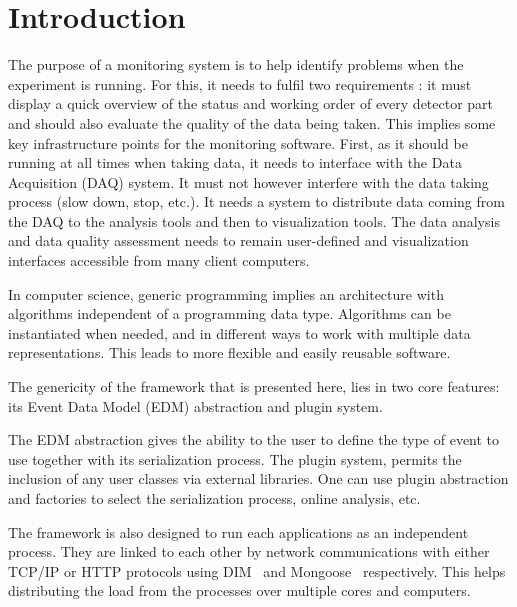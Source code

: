 \documentclass[conference]{IEEEtran}
\begin{document}
%
\IEEEpeerreviewmaketitle



\section{Introduction}
The purpose of a monitoring system is to help identify problems when the experiment is running. For this, it needs to fulfil two requirements : it must display a quick overview of the status and working order of every detector part and should also evaluate the quality of the data being taken. This implies some key infrastructure points for the monitoring software. First, as it should be running at all times when taking data, it needs to interface with the Data Acquisition (DAQ) system. It must not however interfere with the data taking process (slow down, stop, etc.). It needs a system to distribute data coming from the DAQ to the analysis tools and then to visualization tools. The data analysis and data quality assessment needs to remain user-defined and visualization interfaces accessible from many client computers.

In computer science, generic programming implies an architecture with algorithms independent of a programming data type. Algorithms can be instantiated when needed, and in different ways to work with multiple data representations. This leads to more flexible and easily reusable software.

The genericity of the framework that is presented here, lies in two core features: its Event Data Model (EDM) abstraction and plugin system.

The EDM abstraction gives the ability to the user to define the type of event to use together with its serialization process. The plugin system, permits the inclusion of any user classes via external libraries. One can use plugin abstraction and factories to select the serialization process, online analysis, etc.

The framework is also designed to run each applications as an independent process. They are linked to each other by network communications with either TCP/IP or HTTP protocols using DIM~\cite{DIM} and Mongoose~\cite{MONGOOSE} respectively. This helps distributing the load from the processes over multiple cores and computers.
\end{document}

